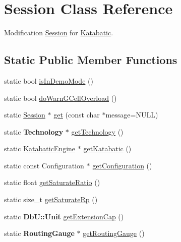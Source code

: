 \hypertarget{classKatabatic_1_1Session}{}\section{Session Class Reference}
\label{classKatabatic_1_1Session}


Modification \mbox{\hyperlink{classKatabatic_1_1Session}{Session}} for \mbox{\hyperlink{namespaceKatabatic}{Katabatic}}.  


\subsection*{Static Public Member Functions}
\begin{DoxyCompactItemize}
\item 
static bool \mbox{\hyperlink{classKatabatic_1_1Session_a037c7ec3b18ec43973f2e6fe3a172000}{is\+In\+Demo\+Mode}} ()
\item 
static bool \mbox{\hyperlink{classKatabatic_1_1Session_ad41e6fb02bd7bb01c27fb6aae36f0ddc}{do\+Warn\+G\+Cell\+Overload}} ()
\item 
static \mbox{\hyperlink{classKatabatic_1_1Session}{Session}} $\ast$ \mbox{\hyperlink{classKatabatic_1_1Session_a76f17c3642eaeba85fa0af5ae9d208b4}{get}} (const char $\ast$message=N\+U\+LL)
\item 
static \textbf{ Technology} $\ast$ \mbox{\hyperlink{classKatabatic_1_1Session_a109acfd064f3c1854abb8bb2c9b4ad30}{get\+Technology}} ()
\item 
static \mbox{\hyperlink{classKatabatic_1_1KatabaticEngine}{Katabatic\+Engine}} $\ast$ \mbox{\hyperlink{classKatabatic_1_1Session_a1ec4ff2ad2a5b964c0ff98170a366197}{get\+Katabatic}} ()
\item 
static const Configuration $\ast$ \mbox{\hyperlink{classKatabatic_1_1Session_a4d9fd503149d2fff66eb8ba3955b7a13}{get\+Configuration}} ()
\item 
static float \mbox{\hyperlink{classKatabatic_1_1Session_a266a4079ca235e8fdb622ef4996d324d}{get\+Saturate\+Ratio}} ()
\item 
static size\+\_\+t \mbox{\hyperlink{classKatabatic_1_1Session_adfdaa8b3e81de14fce1f99444b35fcda}{get\+Saturate\+Rp}} ()
\item 
static \textbf{ Db\+U\+::\+Unit} \mbox{\hyperlink{classKatabatic_1_1Session_a909ce95ac840ee708f9a49366f0c2690}{get\+Extension\+Cap}} ()
\item 
static \textbf{ Routing\+Gauge} $\ast$ \mbox{\hyperlink{classKatabatic_1_1Session_a9a05289b33122f312aa2c88c4b023292}{get\+Routing\+Gauge}} ()

\end{DoxyCompactItemize}
